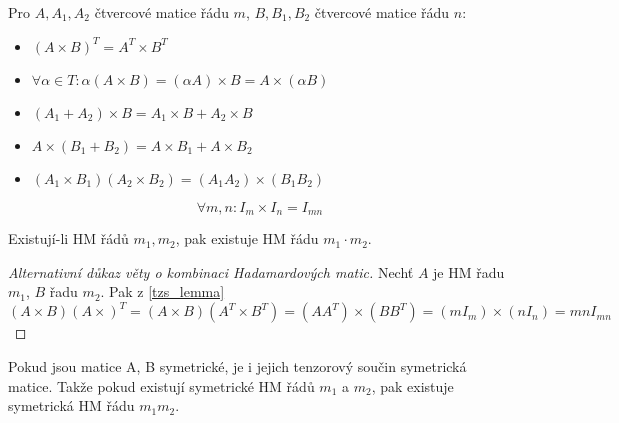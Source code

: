 \begin{lemma}\label{tzs_lemma}
    Pro $A,A_1,A_2$ čtvercové matice řádu $m$, $B,B_1,B_2$ čtvercové matice řádu $n$:
    \begin{itemize}
        \item $(A\times B)^T=A^T\times B^T$
        \item $\forall \alpha\in T: \alpha(A\times B)=(\alpha A)\times B=A\times(\alpha B)$
        \item $(A_1+A_2)\times B=A_1\times B+A_2\times B$
        \item $A\times(B_1+B_2)=A\times B_1+A\times B_2$
        \item $(A_1\times B_1)(A_2\times B_2)=(A_1A_2)\times(B_1B_2)$
    \end{itemize}
\end{lemma}

\begin{observation}
	\[ \forall m,n: I_m \times I_n = I_{mn} \]
\end{observation}

\begin{theorem}\label{hm_komb_a}
    Existují-li HM řádů $m_1,m_2$, pak existuje HM řádu $m_1\cdot m_2$.
\end{theorem}
\begin{proof}[Alternativní důkaz věty o kombinaci Hadamardových matic]
	Nechť $A$ je HM řadu $m_1$, $B$ řadu $m_2$.
	Pak z \cref{tzs_lemma}
	\[ (A \times B)(A \times)^T = (A \times B)(A^T \times B^T) = (AA^T)\times (BB^T) = (mI_m)\times (nI_n) = mn I_{mn} \]
\end{proof}

\begin{note}
	Pokud jsou matice A, B symetrické, je i jejich tenzorový součin symetrická matice.
	Takže pokud existují symetrické HM řádů $m_1$ a $m_2$, pak existuje symetrická HM řádu $m_1 m_2$.
\end{note}

